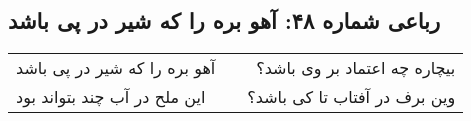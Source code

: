 \begin{center}
\section*{رباعی شماره ۴۸: آهو بره را که شیر در پی باشد}
\label{sec:048}
\begin{longtable}{l p{0.5cm} r}
آهو بره را که شیر در پی باشد
&&
بیچاره چه اعتماد بر وی باشد؟
\\
این ملح در آب چند بتواند بود
&&
وین برف در آفتاب تا کی باشد؟
\\
\end{longtable}
\end{center}
